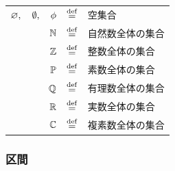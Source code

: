 \documentclass[a4j, 9pt]{ltjsarticle}
\begin{document}
        \begin{center}
          \begin{tablehere}
            \centering
            \begin{tabular}{rcl}
              
              $\displaystyle \varnothing, \quad \emptyset, \quad \phi$  & $\displaystyle \stackrel{\mathrm{def}}{=}$  & 空集合\\
              $\displaystyle \mathbb{N}$                                & $\displaystyle \stackrel{\mathrm{def}}{=}$  & 自然数全体の集合\\ 
              $\displaystyle \mathbb{Z}$                                & $\displaystyle \stackrel{\mathrm{def}}{=}$  & 整数全体の集合\\ 
              $\displaystyle \mathbb{P}$                                & $\displaystyle \stackrel{\mathrm{def}}{=}$  & 素数全体の集合\\ 
              $\displaystyle \mathbb{Q}$                                & $\displaystyle \stackrel{\mathrm{def}}{=}$  & 有理数全体の集合\\ 
              $\displaystyle \mathbb{R}$                                & $\displaystyle \stackrel{\mathrm{def}}{=}$  & 実数全体の集合\\ 
              $\displaystyle \mathbb{C}$                                & $\displaystyle \stackrel{\mathrm{def}}{=}$  & 複素数全体の集合\\ 
              
            \end{tabular}
          \end{tablehere}
        \end{center}

      \subsubsection{区間}
        
\end{document}

